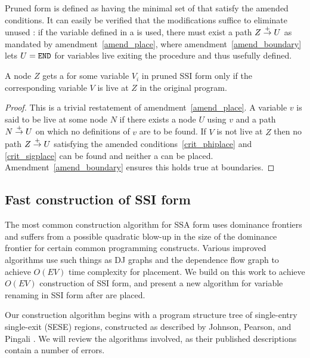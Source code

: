 \documentclass[12pt,titlepage,twoside]{article}
\begin{document}
Pruned form is defined as having the minimal set of 
that satisfy the amended conditions.  It can easily be verified that
the modifications suffice to eliminate unused : if
the variable defined in a \phisigfunction[or]{} is used, there must
exist a path $Z\stackrel{+}{\rightarrow} U$ as mandated by amendment~\ref{amend_place},
where amendment~\ref{amend_boundary} lets $U = \texttt{END}$ for
variables live exiting the procedure and thus usefully defined.

\begin{property}\label{pty:pruned_live}
A node $Z$ gets a \phisigfunction[or]{} for some variable $V_i$ in
pruned SSI form only if the corresponding variable $V$ is live at $Z$
in the original program.
\end{property}
\begin{proof}
This is a trivial restatement of amendment~\ref{amend_place}.  A
variable $v$ is said to be live at some node $N$ if there exists
a node $U$ using $v$ and a path $N\stackrel{+}{\rightarrow} U$ on which no definitions
of $v$ are to be found.  If $V$ is not live at $Z$ then no path
$Z\stackrel{+}{\rightarrow} U$ satisfying the amended conditions~\ref{crit_phiplace}
and \ref{crit_sigplace} can be found and neither a
\phisigfunction[or]{} can be placed.  Amendment~\ref{amend_boundary}
ensures this holds true at boundaries.
\end{proof}

\subsection{Fast construction of SSI form}
The most common construction algorithm for SSA form
\cite{cytron91:ssa} uses dominance frontiers and suffers from a
possible quadratic blow-up in the size of the dominance frontier for
certain common programming constructs.  Various improved algorithms
use such things as DJ graphs \cite{sreedhar95:lintime} and the
dependence flow graph \cite{johnson93:dfg} to achieve $O(EV)$ time
complexity for \phifunction placement.  We build on this work to
achieve $O(EV)$ construction of SSI form, and present a new algorithm
for variable renaming in SSI form after  are placed.

Our construction algorithm begins with a program structure tree of
single-entry single-exit (SESE) regions, constructed as described by
Johnson, Pearson, and Pingali \cite{johnson94:pst}.  We will review
the algorithms involved, as their published descriptions
\cite{johnson93:sese} contain a number of errors.
\end{document}
